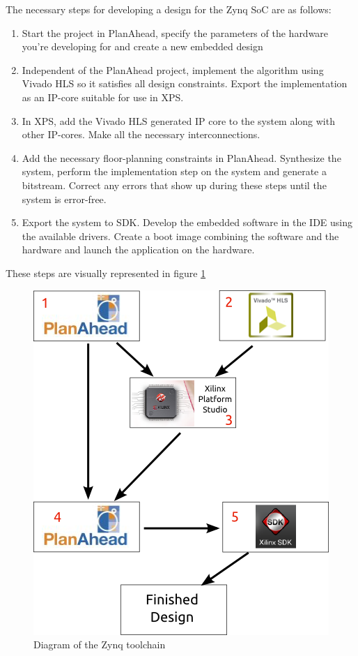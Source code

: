 The necessary steps for developing a design for the Zynq SoC are as follows:

\begin{enumerate}
	\item Start the project in PlanAhead, specify the parameters of the hardware you're developing for and create a new embedded design
	\item Independent of the PlanAhead project, implement the algorithm using Vivado HLS so it satisfies all design constraints. Export the implementation as an IP-core suitable for use in XPS.
	\item In XPS, add the Vivado HLS generated IP core to the system along with other IP-cores. Make all the necessary interconnections.
	\item Add the necessary floor-planning constraints in PlanAhead. Synthesize the system, perform the implementation step on the system and generate a bitstream. Correct any errors that show up during these steps until the system is error-free.
	\item Export the system to SDK. Develop the embedded software in the IDE using the available drivers. Create a boot image combining the software and the hardware and launch the application on the hardware.
\end{enumerate}
These steps are visually represented in figure \ref{img:toolchain_diagram}

\begin{figure}[H]
\centering
\includegraphics[scale=0.7]{./images/toolchain_diagram/toolchain_diagram.png}
\caption{Diagram of the Zynq toolchain}
\label{img:toolchain_diagram}
\end{figure}

